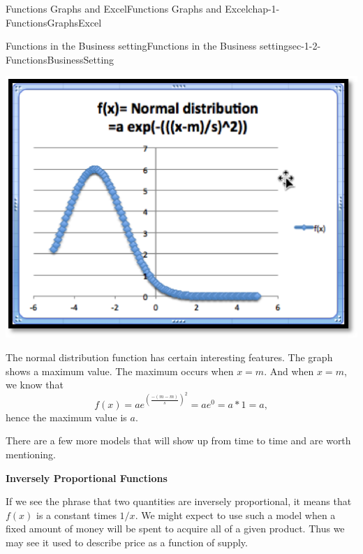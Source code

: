 \documentclass[oneside,10pt,]{book}
\newcommand{\terminology}[1]{\textbf{#1}}
\numberwithin{equation}{section}
\begin{document}
\begin{chapterptx}{Functions Graphs and Excel}{}{Functions Graphs and Excel}{}{}{chap-1-FunctionsGraphsExcel}
\begin{sectionptx}{Functions in the Business setting}{}{Functions in the Business setting}{}{}{sec-1-2-FunctionsBusinessSetting}
\begin{sidebyside}{1}{0.25}{0.25}{0}
\begin{sbspanel}{0.5}
\includegraphics[width=1\linewidth]{images/sec1-2-NormalCurve.png}
\end{sbspanel}%
\end{sidebyside}%
\par
\hypertarget{p-163}{}%
The normal distribution function has certain interesting features. The graph shows a maximum value. The maximum occurs when \(x = m\). And when \(x = m\), we know that%
%
\begin{equation*}
f(x)=a e^{\left(\frac{-(m-m)}{s}\right)^2}=a e^0=a*1=a,
\end{equation*}
\hypertarget{p-164}{}%
hence the maximum value is \(a\).%
\par
\hypertarget{p-165}{}%
There are a few more models that will show up from time to time and are worth mentioning.%
\par
\hypertarget{p-166}{}%
\terminology{Inversely Proportional Functions}%
\par
\hypertarget{p-167}{}%
If we see the phrase that two quantities are inversely proportional, it means that \(f(x)\) is a constant times \(1/x\).  We might expect to use such a model when a fixed amount of money will be spent to acquire all of a given product.  Thus we may see it used to describe price as a function of supply.%
\begin{sidebyside}{1}{0.25}{0.25}{0}%
\begin{sbspanel}{0.5}%

\end{sbspanel}
\end{sidebyside}
\end{sectionptx}
\end{chapterptx}
\end{document}
